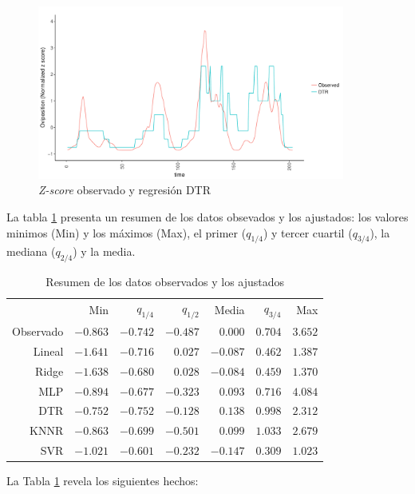     \begin{figure}[hbt]
    \centering%
    \includegraphics[width=0.9\textwidth]{images/dtr}%
    \caption{\textit{Z-score} observado y regresión DTR}\label{fig:dtr}
    \end{figure}



  \par La tabla \ref{Tab:Summary} presenta un resumen de los datos obsevados
    y los ajustados: los valores minimos (Min) y los máximos (Max), el
    primer ($q_{1/4}$) y tercer cuartil ($q_{3/4}$), la mediana ($q_{2/4}$)
    y la media.

  \begin{table}[hbt]
  \centering
  \caption{Resumen de los datos observados y los ajustados}\label{Tab:Summary}
  \begin{tabular}{*7{r}}
  \toprule
  &Min	&$q_{1/4}$	&$q_{1/2}$	&Media	&$q_{3/4}$	&Max\\ \cmidrule(lr){2-7}
  Observado	&$-0.863$	&$-0.742$	&$-0.487$	&$0.000$	&$0.704$	&$3.652$\\
  Lineal	&$-1.641$	&$-0.716$	&$ 0.027$	&$-0.087$	&$0.462$	&$1.387$\\
  Ridge	&$-1.638$	&$-0.680$	&$ 0.028$	&$-0.084$	&$0.459$	&$1.370$\\
  MLP	&$-0.894$	&$-0.677$	&$-0.323$	&$0.093$	&$0.716$	&$4.084$\\
  DTR	&$-0.752$	&$-0.752$	&$-0.128$	&$0.138$	&$0.998$	&$2.312$\\
  KNNR	&$-0.863$	&$-0.699$	&$-0.501$	&$0.099$	&$1.033$	&$2.679$\\
  SVR	&$-1.021$	&$-0.601$	&$-0.232$	&$-0.147$	&$0.309$	&$1.023$\\
  \bottomrule
  \end{tabular}
  \end{table}

  \par La Tabla \ref{Tab:Summary} revela los siguientes hechos:


